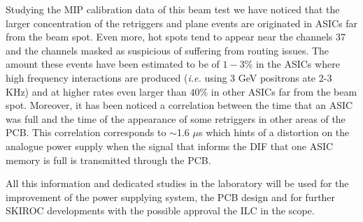 \documentclass[final,3p,times,twocolumn]{elsarticle}
\begin{document}
Studying the MIP calibration data of this beam test we have noticed that the larger concentration of the retriggers and plane events are originated 
in
ASICs far from the beam spot. Even more, hot spots tend to appear near the channels 37 and the channels masked
as suspicious of suffering from routing issues. The amount these events have been estimated to be of $1-3\%$ in the ASICs where high frequency
interactions are produced ({\it i.e.} using 3 GeV positrons ate 2-3 KHz) and at higher rates even larger than $40\%$ in other 
ASICs far from the beam spot.
Moreover, it has been noticed a correlation between the time that an ASIC was full and the time of the appearance of some 
retriggers in other areas of the PCB. 
This correlation corresponds to $\sim$1.6 $\mu$s which hints
of a distortion on the analogue power supply when
the signal that informs the DIF that one ASIC memory is full is transmitted through the PCB.

All this information and dedicated studies in the laboratory will be used for the
improvement of the power supplying system, the PCB design and for further SKIROC developments 
with the possible approval the ILC in the scope.


%


\end{document}
